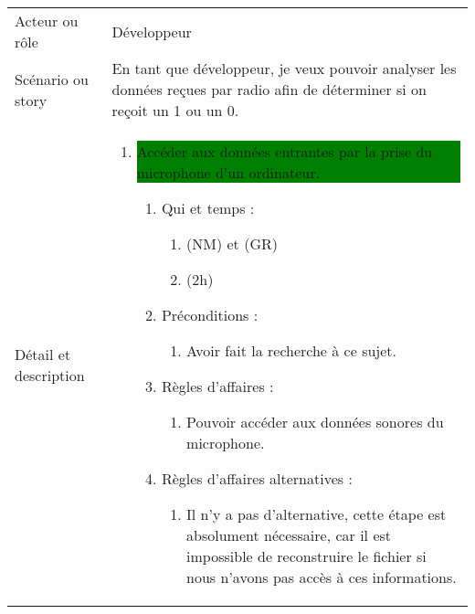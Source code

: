 \begin{longtable}{|l|p{}|}
\hline
    \rowcolor{Gray}
    \multicolumn{2}{|l|}{3} \\
\hline
    Acteur ou rôle & Développeur \\
\hline
    Scénario ou story & En tant que développeur, je veux pouvoir analyser les données reçues par radio afin de déterminer si on reçoit un 1 ou un 0. \\
\hline
    Détail et description &
        \begin{enumerate}[label*=\arabic*.]
            \item \colorbox{Green}{\parbox{13cm}{Accéder aux données entrantes par la prise du microphone d'un ordinateur.}}
                \begin{enumerate}[label*=\arabic*.]
                                \item Qui et temps :
                                \begin{enumerate}[label*=\arabic*.]
                                    \item (NM) et (GR)
                                    \item (2h)
                                \end{enumerate}
                                \item Préconditions :
                                \begin{enumerate}[label*=\arabic*.]
                                    \item Avoir fait la recherche à ce sujet.
                                \end{enumerate}
                                \item Règles d'affaires :
                                \begin{enumerate}[label*=\arabic*.]
                                    \item Pouvoir accéder aux données sonores du microphone.
                                \end{enumerate}
                                \item Règles d'affaires alternatives :
                                \begin{enumerate}[label*=\arabic*.]
                                    \item Il n'y a pas d'alternative, cette étape est absolument nécessaire, car il est impossible de reconstruire le fichier si nous n'avons pas accès à ces informations.
                                \end{enumerate}

\end{enumerate}
\end{enumerate}
\end{longtable}

